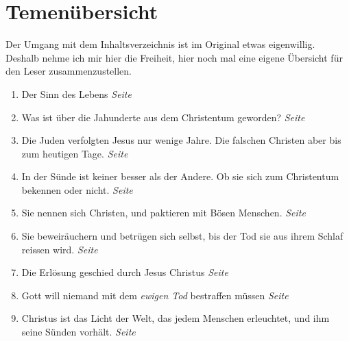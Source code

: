 \chapter{Temenübersicht}


Der Umgang mit dem Inhaltsverzeichnis ist im Original etwas eigenwillig. Deshalb
nehme ich mir hier die Freiheit, hier noch mal eine eigene Übersicht für den
Leser zusammenzustellen.

\begin{enumerate}
 \item Der Sinn des Lebens
 \dotfill \textit{Seite \pageref{ref:vorw_sinndes_lebens}}\\

 \item Was ist über die Jahunderte aus dem Christentum geworden?
 \dotfill \textit{Seite \pageref{ref:01_02_urchristentum}}\\
 
 \item Die Juden verfolgten Jesus nur wenige Jahre. Die falschen Christen aber
bis zum heutigen Tage.
 \dotfill \textit{Seite \pageref{ref:01_04_zweite_kreuzigung}}\\
 
 \item In der Sünde ist keiner besser als der Andere. Ob sie sich zum
Christentum bekennen oder nicht.
 \dotfill \textit{Seite \pageref{ref:01_05_in_suende_gleich}}\\
 
 \item Sie nennen sich Christen, und paktieren mit Bösen Menschen.
 \dotfill \textit{Seite
\pageref{ref:01_05_in_suende_verbinden}}\\

 \item Sie beweiräuchern und betrügen sich selbst, bis der Tod sie aus ihrem
Schlaf reissen wird.
 \dotfill \textit{Seite \pageref{ref:01_07_selbstbetrug}}\\
 
 \item Die Erlösung geschied durch Jesus Christus
 \dotfill \textit{Seite
\pageref{ref:01_10_jesus_der_erloeser}}\\

 \item Gott will niemand mit dem \textit{ewigen Tod} bestraffen müssen
 \dotfill \textit{Seite
\pageref{ref:02_02_kein_gefallen_am_tod}}\\

 \item Christus ist das Licht der Welt, das jedem Menschen erleuchtet, und ihm
seine Sünden vorhält.
 \dotfill \textit{Seite \pageref{ref:02_03_gott_in_jedem}}\\
 

\end{enumerate}
